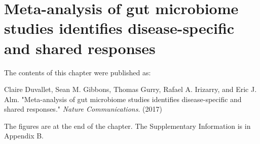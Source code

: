 
\graphicspath{{meta-analysis/figures/}}

\chapter{Meta-analysis of gut microbiome studies identifies disease-specific and shared responses}

The contents of this chapter were published as:

Claire Duvallet, Sean M. Gibbons, Thomas Gurry, Rafael A. Irizarry, and Eric J. Alm. "Meta-analysis of gut microbiome studies identifies disease-specific and shared responses." \textit{Nature Communications}. (2017)

The figures are at the end of the chapter. The Supplementary Information is in Appendix B.

\clearpage

